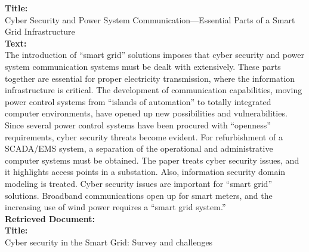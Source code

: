 
\begin{figure*}[ht!]
    \centering
    \begin{tcolorbox}[
        enhanced,                  %
        colframe=red!70!black,     %
        colback=red!5,             %
        coltitle=white,            %
        colbacktitle=red!70!black, %
        width=\textwidth,          %
        arc=4mm,                   %
        boxrule=1mm,               %
        drop shadow,               %
        title=Cyber Security and Smart Grid Communication, %
        fonttitle=\bfseries\large  %
    ]

    \textbf{Title:}\\[0.5em]
    Cyber Security and Power System Communication—Essential Parts of a Smart Grid Infrastructure\\[1em]

    \textbf{Text:}\\[0.5em]
    The introduction of “smart grid” solutions imposes that cyber security and power system communication systems must be dealt with extensively. These parts together are essential for proper electricity transmission, where the information infrastructure is critical. The development of communication capabilities, moving power control systems from “islands of automation” to totally integrated computer environments, have opened up new possibilities and vulnerabilities. Since several power control systems have been procured with “openness” requirements, cyber security threats become evident. For refurbishment of a SCADA/EMS system, a separation of the operational and administrative computer systems must be obtained. The paper treats cyber security issues, and it highlights access points in a substation. Also, information security domain modeling is treated. Cyber security issues are important for “smart grid” solutions. Broadband communications open up for smart meters, and the increasing use of wind power requires a “smart grid system.”\\[1em]

    \textbf{Retrieved Document:}\\[1em]
    \textbf{Title:}\\[0.5em]
    Cyber security in the Smart Grid: Survey and challenges\\[0.5em]


\end{tcolorbox}
\end{figure*}
